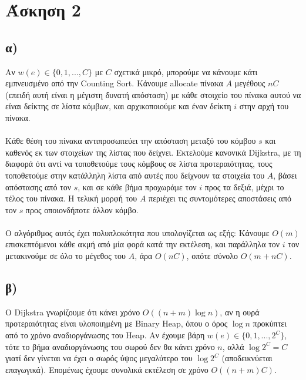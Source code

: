 \documentclass[12pt,a4paper]{article}
\begin{document}
  \section{Άσκηση 2}

  \subsection{α)}

    Αν \(w(e) \in \{0, 1, ..., C\}\) με \(C\) σχετικά μικρό, μπορούμε να
    κάνουμε κάτι εμπνευσμένο από την {\latintext Counting Sort}. Κάνουμε
    {\latintext allocate} πίνακα \(Α\) μεγέθους \(nC\) (επειδή αυτή είναι η
    μέγιστη δυνατή απόσταση) με κάθε στοιχείο του πίνακα αυτού να είναι δείκτης
    σε λίστα κόμβων, και αρχικοποιούμε και έναν δείκτη \(i\) στην αρχή
    του πίνακα.
    \\
    \\
    Κάθε θέση του πίνακα αντιπροσωπεύει την απόσταση μεταξύ του κόμβου \(s\) 
    και καθενός εκ των στοιχείων της λίστας που δείχνει. Εκτελούμε κανονικά
    {\latintext Dijkstra}, με τη διαφορά ότι αντί να τοποθετούμε τους κόμβους
    σε λίστα προτεραιότητας, τους τοποθετούμε στην κατάλληλη λίστα από αυτές που
    δείχνουν τα στοιχεία του \(A\), βάσει απόστασης από τον \(s\),
    και σε κάθε βήμα προχωράμε τον \(i\) προς τα δεξιά, μέχρι το τέλος του
    πίνακα. Η τελική μορφή του \(Α\) περιέχει τις συντομότερες αποστάσεις
    από τον \(s\) προς οποιονδήποτε άλλον κόμβο.
    \\
    \\
    Ο αλγόριθμος αυτός έχει πολυπλοκότητα που υπολογίζεται ως εξής:
    Κάνουμε \(Ο(m)\) επισκεπτόμενοι κάθε ακμή από μία φορά κατά την εκτέλεση,
    και παράλληλα τον \(i\) τον μετακινούμε σε όλο το μέγεθος του \(Α\),
    άρα \(O(nC)\), οπότε σύνολο \(O(m + nC)\).
  
  \subsection{β)}

    O {\latintext Dijkstra} γνωρίζουμε ότι κάνει χρόνο
    \(Ο((n + m)\log{n})\), αν η ουρά προτεραιότητας είναι υλοποιημένη με
    {\latintext Binary Heap}, όπου ο όρος \(\log{n}\) προκύπτει από το χρόνο
    αναδιοργάνωσης του {\latintext Heap}. Αν έχουμε βάρη 
    \(w(e) \in \{0, 1, ..., 2^C\}\), τότε το βήμα αναδιοργάνωσης του σωρού δεν
    θα κάνει χρόνο \(n\), αλλά \(\log{2^C} = C\) γιατί δεν γίνεται να έχει
    ο σωρός ύψος μεγαλύτερο του \(\log{2^C}\) (αποδεικνύεται επαγωγικά).
    Επομένως έχουμε συνολικά
    εκτέλεση σε χρόνο \(Ο((n + m)C)\).
\end{document}
